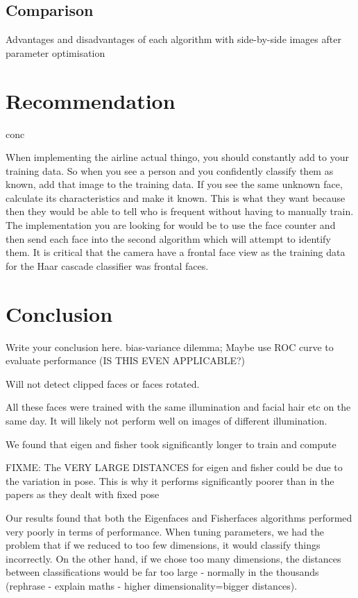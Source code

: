 \documentclass{article}
\begin{document}
\subsection{Comparison}
Advantages and disadvantages of each algorithm with side-by-side images after parameter optimisation


\section{Recommendation}
conc

When implementing the airline actual thingo, you should constantly add to your training data.
So when you see a person and you confidently classify them as known, add that image to the training data.
If you see the same unknown face, calculate its characteristics and make it known. This is what they want because then they would be able to tell who is frequent without having to manually train.
The implementation you are looking for would be to use the face counter and then send each face into the second algorithm which will attempt to identify them.
It is critical that the camera have a frontal face view as the training data for the Haar cascade classifier was frontal faces.


\section{Conclusion}
Write your conclusion here. \citep{guyon1997scaling} \citep{belhumeur1997eigenfaces}
bias-variance dilemma; Maybe use ROC curve to evaluate performance (IS THIS EVEN APPLICABLE?)

Will not detect clipped faces or faces rotated.

All these faces were trained with the same illumination and facial hair etc on the same day. It will likely not perform well on images of different illumination.

We found that eigen and fisher took significantly longer to train and compute

FIXME: The VERY LARGE DISTANCES for eigen and fisher could be due to the variation in pose. This is why it performs significantly poorer than in the papers as they dealt with fixed pose

Our results found that both the Eigenfaces and Fisherfaces algorithms performed very poorly in terms of performance. When tuning parameters, we had the problem that if we reduced to too few dimensions, it would classify things incorrectly. On the other hand, if we chose too many dimensions, the distances between classifications would be far too large - normally in the thousands (rephrase - explain maths - higher dimensionality=bigger distances).
\end{document}
